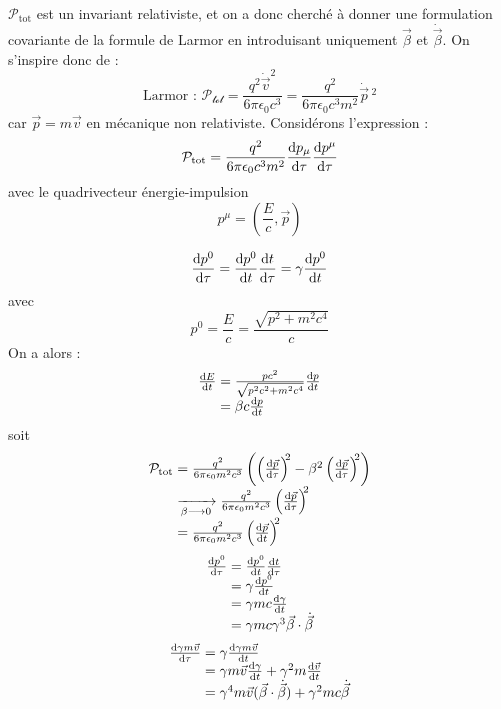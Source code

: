 {\txt $\mathcal{P}_\text{tot}$ est un invariant relativiste, et on a donc cherché à donner une formulation covariante de la formule de Larmor en introduisant uniquement $\vec{\beta}$ et $\dot{\vec{\beta}}$}. On s'inspire donc de :
$$
	\text{Larmor : }\mathcal{P_\text{tot}}=\frac{q^2\dot{\vec{v}}^2}{6\pi\epsilon_0c^3}=\frac{q^2}{6\pi\epsilon_0c^3m^2}\dot{\vec{p}}\,^2
$$
car $\vec{p}=m\vec{v}$ en mécanique non relativiste. Considérons l'expression :
$$
	\mathcal{P}_\text{tot}=\frac{q^2}{6\pi\epsilon_0c^3m^2}\frac{\mathrm{d} p_\mu}{\mathrm{d}\tau}\frac{\mathrm{d} p^\mu}{\mathrm{d}\tau}
$$
avec le quadrivecteur énergie-impulsion
$$
	p^\mu=\left(\frac{E}{c},\vec{p}\right)
$$

$$
	\frac{\mathrm{d} p^0}{\mathrm{d}\tau}=\frac{\mathrm{d} p^0}{\mathrm{d} t}\frac{\mathrm{d} t}{\mathrm{d} \tau}=\gamma\frac{\mathrm{d} p^0}{\mathrm{d} t}
$$
avec
$$
	p^0=\frac{E}{c}=\frac{\sqrt{p^2+m^2c^4}}{c}
$$
On a alors :
$$
	\begin{array}{r@{\;}l}
		\frac{\dif E}{\dif t}&=\frac{pc^2}{\sqrt{p^2c^2+m^2c^4}}\frac{\dif p}{\dif t}\\
			&=\beta c\frac{\dif p}{\dif t}
	\end{array}
$$
soit
$$
	\begin{array}{r@{\;}l}
		\mathcal{P}_\text{tot}&=\frac{q^2}{6\pi\epsilon_0m^2c^3}\left(\left(\frac{\dif\vec{p}}{\dif\tau}\right)^{\!\!2}-\beta^2\left(\frac{\dif\vec{p}}{\dif\tau}\right)^{\!\!2}\right)\\
			&\xrightarrow[\beta\longrightarrow 0]{}\frac{q^2}{6\pi\epsilon_0m^2c^3}\left(\frac{\dif\vec{p}}{\dif\tau}\right)^{\!\!2}\\
			&=\frac{q^2}{6\pi\epsilon_0m^2c^3}\left(\frac{\dif\vec{p}}{\dif t}\right)^{\!\!2}
	\end{array}
$$
\vspace{1cm}
$$
	\begin{array}{r@{\;}l}
		\frac{\dif p^0}{\dif\tau}&=\frac{\dif p^0}{\dif t}\frac{\dif t}{\dif\tau}\\
			&=\gamma\frac{\dif p^0}{\dif t}\\
			&=\gamma mc\frac{\dif\gamma}{\dif t}\\
			&=\gamma mc\gamma^3\vec{\beta}\cdot\dot{\vec{\beta}}
	\end{array}
$$
\vspace{1cm}
$$
	\begin{array}{r@{\;}l}
		\frac{\dif\gamma m\vec{v}}{\dif \tau}&=\gamma\frac{\dif\gamma m\vec{v}}{\dif t}\\
			&=\gamma m\vec{v}\frac{\dif\gamma}{\dif t}+\gamma^2m\frac{\dif\vec{v}}{\dif t}\\
			&=\gamma^4m\vec{v}(\vec{\beta}\cdot\dot{\vec{\beta}})+\gamma^2mc\dot{\vec{\beta}}
	\end{array}
$$
